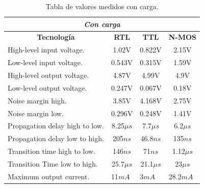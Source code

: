\begin{table}[H]
\center
\begin{tabular}{|l|c|c|c|}
\hline
\multicolumn{4}{|c|}{\textit{\textbf{Con carga}}}                                                                                      \\ \hline
\multicolumn{1}{|c|}{\textbf{Tecnología}} & \textbf{RTL}              & \textbf{TTL}             & \multicolumn{1}{l|}{\textbf{N-MOS}} \\ \hline
High-level input voltage.                 & 1.02V                     & 0.822V                   & 2.15V                                \\ \hline
Low-level input voltage.                  & 0.543V                    & 0.315V                   & 1.59V                               \\ \hline
High-level output voltage.                & 4.87V                     & 4.99V                    & 4.9V                                \\ \hline
Low-level output voltage.                 & 0.247V                    & 0.067V                   & 0.18V                               \\ \hline
Noise margin high.                        & 3.85V                     & 4.168V                   & 2.75V                               \\ \hline
Noise margin low.                         & 0.296V                    & 0.248V                   & 1.41V                               \\ \hline
Propagation delay high to low.            & 8.25$\mu s$               & 7.7$\mu s$               & 6.2$\mu s$                             \\ \hline
Propagation delay low to high.            & 205$ns$                   & 46.8$ns$                 & 135$ns$                              \\ \hline
Transition time high to low.              & 146$ns$                   & 71$ns$                   & 1.12$\mu s$                               \\ \hline
Transition Time low to high.              & 25.7$\mu s$               & 21.1$\mu s$              & 23$\mu s$                                \\ \hline
Maximum output current.                   & \multicolumn{1}{l|}{11$mA$} & \multicolumn{1}{l|}{3$mA$} & \multicolumn{1}{l|}{28.2$mA$}         \\ \hline
\end{tabular}
\caption{Tabla de valores medidos con carga.}
\label{tab:ej1_con_carga}
\end{table}

